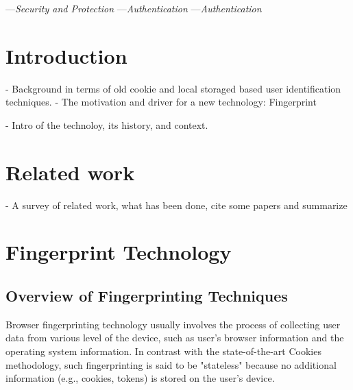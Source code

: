 \documentclass{acm_proc_article-sp}
\begin{document}

---\textit{Security and Protection}
---\textit{Authentication}
---\textit{Authentication}



\section{Introduction}
- Background in terms of old cookie and local storaged based user identification techniques.
- The motivation and driver for a new technology: Fingerprint

- Intro of the technoloy, its history, and context.

\section{Related work}
- A survey of related work, what has been done, cite some papers and summarize 

\section{Fingerprint Technology}

\subsection{Overview of  Fingerprinting Techniques}
Browser fingerprinting technology usually involves the process of collecting user data from various level of the device, such as user's browser information and the operating system information. \cite{pierre:beauty}
In contrast with the state-of-the-art Cookies methodology, such fingerprinting is said to be "stateless" because no additional information (e.g., cookies, tokens) is stored on the user's device. 
\end{document}
